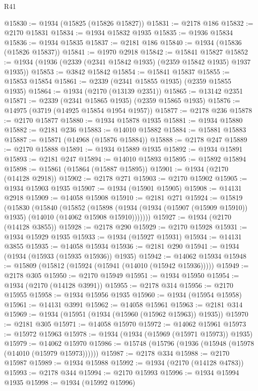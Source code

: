 \begin{lexlean}{R41}
\begin{coremodule}
@15830 := @1934 (@15825 (@15826 @15827))
@15831 := @2178 @186
@15832 := @2170 @15831
@15834 := @1934 @15832 @1935
@15835 := @1936 @15834
@15836 := @1934 @15835
@15837 := @2181 @186
@15840 := @1934 (@15836 (@15826 @15837))
@15841 := @1970 @2918
@15842 := @15841 @15827
@15852 := @1934 (@1936 (@2339 (@2341 @15842 @1935) (@2359 @15842 @1935) @1937 @1935))
@15853 := @3842 @15842
@15854 := @15841 @15837
@15855 := @15853 @15854
@15861 := @2339 (@2341 @15855 @1935) (@2359 @15855 @1935)
@15864 := @1934 (@2170 (@13139 @2351))
@15865 := @13142 @2351
@15871 := @2339 (@2341 @15865 @1935) (@2359 @15865 @1935)
@15876 := @14975 (@3719 (@14925 @15854 @1954 @1957))
@15877 := @2178 @236
@15878 := @2170 @15877
@15880 := @1934 @15878 @1935
@15881 := @1934 @15880
@15882 := @2181 @236
@15883 := @14010 @15882
@15884 := @15881 @15883
@15887 := @15871 (@14968 (@15876 @15884))
@15888 := @2178 @247
@15889 := @2170 @15888
@15891 := @1934 @15889 @1935
@15892 := @1934 @15891
@15893 := @2181 @247
@15894 := @14010 @15893
@15895 := @15892 @15894
@15898 := @15861 (@15864 (@15887 @15895))
@15901 := @1934 (@2170 (@14128 @2918))
@15902 := @2178 @271
@15903 := @2170 @15902
@15905 := @1934 @15903 @1935
@15907 := @1934 (@15901 @15905)
@15908 := @14131 @2918
@15909 := @14058 @15908
@15910 := @2181 @271
@15924 := @15819
    (@15830
      (@15840
        (@15852
          (@15898 (@1934 (@1934 (@15907 (@15909 @15910)) @1935) (@14010 (@14062 @15908 @15910)))))))
@15927 := @1934 (@2170 (@14128 @3855))
@15928 := @2178 @290
@15929 := @2170 @15928
@15931 := @1934 @15929 @1935
@15933 := @1934 (@15927 @15931)
@15934 := @14131 @3855
@15935 := @14058 @15934
@15936 := @2181 @290
@15941 := @1934 (@1934 (@15933 (@15935 @15936)) @1935)
@15942 := @14062 @15934
@15948 := @15809 (@15812 (@15924 (@15941 (@14010 (@15942 @15936)))))
@15949 := @2178 @305
@15950 := @2170 @15949
@15951 := @1934 @15950
@15954 := @1934 (@2170 (@14128 @3991))
@15955 := @2178 @314
@15956 := @2170 @15955
@15958 := @1934 @15956 @1935
@15960 := @1934 (@15954 @15958)
@15961 := @14131 @3991
@15962 := @14058 @15961
@15963 := @2181 @314
@15969 := @1934 (@15951 (@1934 (@15960 (@15962 @15963)) @1935))
@15970 := @2181 @305
@15971 := @14058 @15970
@15972 := @14062 @15961
@15973 := @15972 @15963
@15978 := @1934 (@1934 (@15969 (@15971 @15973)) @1935)
@15979 := @14062 @15970
@15986 := @15748 (@15796 (@1936 (@15948 (@15978 (@14010 (@15979 @15973))))))
@15987 := @2178 @334
@15988 := @2170 @15987
@15989 := @1934 @15988
@15992 := @1934 (@2170 (@14128 @4783))
@15993 := @2178 @344
@15994 := @2170 @15993
@15996 := @1934 @15994 @1935
@15998 := @1934 (@15992 @15996)

\end{coremodule}
\end{lexlean}
